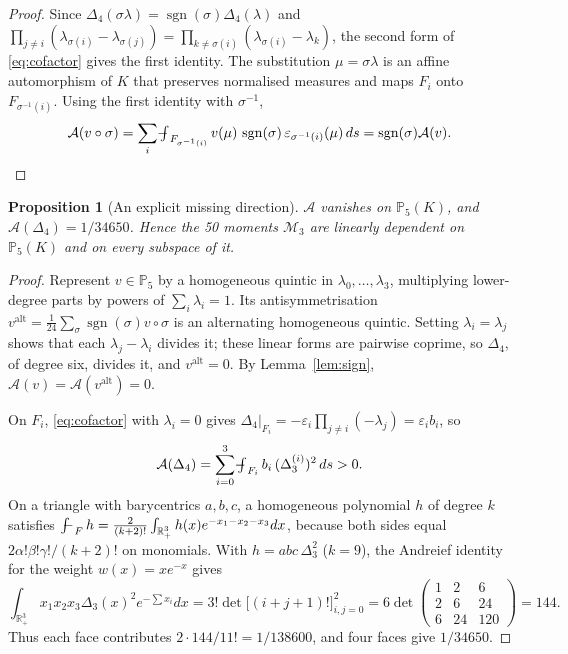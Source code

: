\documentclass[11pt,a4paper]{article}
\newtheorem{proposition}[theorem]{Proposition}
\theoremstyle{definition}
\theoremstyle{remark}
\newcommand{\M}{\mathcal M}
\newcommand{\avg}{\mathop{\mathchoice{{\textstyle\int}\mkern-15.5mu{-}\mkern2mu}{\int\mkern-12mu{-}\mkern1mu}{\int\mkern-11mu{-}}{\int\mkern-11mu{-}}}\nolimits}
\newcommand{\Pol}{\mathbb P}
\begin{document}
\begin{proof}
Since
\(\Delta_4(\sigma\lambda)=\operatorname{sgn}(\sigma)\Delta_4(\lambda)\)
and \(\prod_{j\ne i}(\lambda_{\sigma(i)}-\lambda_{\sigma(j)})=
\prod_{k\ne\sigma(i)}(\lambda_{\sigma(i)}-\lambda_k)\), the second form of
\eqref{eq:cofactor} gives the first identity. The substitution
\(\mu=\sigma\lambda\) is an affine automorphism of \(K\) that preserves
normalised measures and maps \(F_i\) onto \(F_{\sigma^{-1}(i)}\). Using the
first identity with \(\sigma^{-1}\),
\[
 \mathcal A(v\circ\sigma)=\sum_i\avg_{F_{\sigma^{-1}(i)}}v(\mu)\,
 \operatorname{sgn}(\sigma)\,\varepsilon_{\sigma^{-1}(i)}(\mu)\,ds
 =\operatorname{sgn}(\sigma)\mathcal A(v).\qedhere
\]
\end{proof}

\begin{proposition}[An explicit missing direction]
\label{prop:alternating}
\(\mathcal A\) vanishes on \(\Pol_5(K)\), and
\(\mathcal A(\Delta_4)=1/34650\). Hence the 50 moments \(\M_3\) are
linearly dependent on \(\Pol_5(K)\) and on every subspace of it.
\end{proposition}

\begin{proof}
Represent \(v\in\Pol_5\) by a homogeneous quintic in
\(\lambda_0,\dots,\lambda_3\), multiplying lower-degree parts by powers of
\(\sum_i\lambda_i=1\). Its antisymmetrisation
\(v^{\mathrm{alt}}=\frac1{24}\sum_\sigma\operatorname{sgn}(\sigma)v\circ\sigma\)
is an alternating homogeneous quintic. Setting \(\lambda_i=\lambda_j\)
shows that each \(\lambda_j-\lambda_i\) divides it; these linear forms are
pairwise coprime, so \(\Delta_4\), of degree six, divides it, and
\(v^{\mathrm{alt}}=0\). By Lemma~\ref{lem:sign},
\(\mathcal A(v)=\mathcal A(v^{\mathrm{alt}})=0\).

On \(F_i\), \eqref{eq:cofactor} with \(\lambda_i=0\) gives
\(\Delta_4|_{F_i}=-\varepsilon_i\prod_{j\ne i}(-\lambda_j)=\varepsilon_ib_i\),
so
\[
 \mathcal A(\Delta_4)=\sum_{i=0}^3\avg_{F_i}b_i\,(\Delta_3^{(i)})^2\,ds>0.
\]
On a triangle with barycentrics \(a,b,c\), a homogeneous polynomial \(h\)
of degree \(k\) satisfies
\(\avg_F h=\frac{2}{(k+2)!}\int_{\mathbb R_+^3}h(x)e^{-x_1-x_2-x_3}dx\),
because both sides equal \(2\alpha!\beta!\gamma!/(k+2)!\) on monomials.
With \(h=abc\,\Delta_3^2\) (\(k=9\)), the Andreief identity~\cite{For2019}
for the weight \(w(x)=xe^{-x}\) gives
\[
 \int_{\mathbb R_+^3}x_1x_2x_3\Delta_3(x)^2e^{-\sum x_i}dx
 =3!\det\bigl[(i+j+1)!\bigr]_{i,j=0}^{2}
 =6\det\begin{pmatrix}1&2&6\\2&6&24\\6&24&120\end{pmatrix}=144 .
\]
Thus each face contributes \(2\cdot144/11!=1/138600\), and four faces give
\(1/34650\).
\end{proof}
\end{document}

